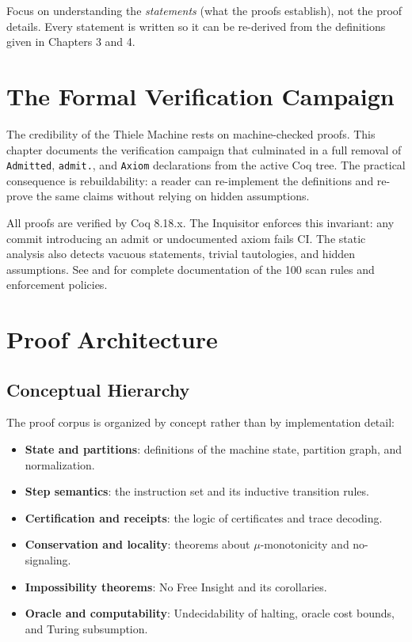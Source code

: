 Focus on understanding the \textit{statements} (what the proofs establish), not the proof details. Every statement is written so it can be re-derived from the definitions given in Chapters 3 and 4.

\section{The Formal Verification Campaign}

The credibility of the Thiele Machine rests on machine-checked proofs. This chapter documents the verification campaign that culminated in a full removal of \texttt{Admitted}, \texttt{admit.}, and \texttt{Axiom} declarations from the active Coq tree. The practical consequence is rebuildability: a reader can re-implement the definitions and re-prove the same claims without relying on hidden assumptions.

All proofs are verified by Coq 8.18.x. The Inquisitor enforces this invariant: any commit introducing an admit or undocumented axiom fails CI. The static analysis also detects vacuous statements, trivial tautologies, and hidden assumptions. See  and  for complete documentation of the 100 scan rules and enforcement policies.

\section{Proof Architecture}

\subsection{Conceptual Hierarchy}

The proof corpus is organized by concept rather than by implementation detail:
\begin{itemize}
    \item \textbf{State and partitions}: definitions of the machine state, partition graph, and normalization.
    \item \textbf{Step semantics}: the instruction set and its inductive transition rules.
    \item \textbf{Certification and receipts}: the logic of certificates and trace decoding.
    \item \textbf{Conservation and locality}: theorems about $\mu$-monotonicity and no-signaling.
    \item \textbf{Impossibility theorems}: No Free Insight and its corollaries.
    \item \textbf{Oracle and computability}: Undecidability of halting, oracle cost bounds, and Turing subsumption.
\end{itemize}

